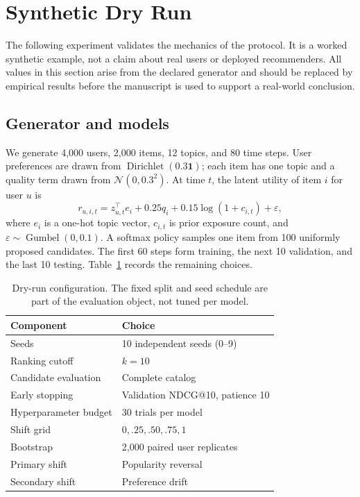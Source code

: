 \section{Synthetic Dry Run}
\label{sec:dryrun}

The following experiment validates the mechanics of the protocol.  It is a
worked synthetic example, not a claim about real users or deployed recommenders.
All values in this section arise from the declared generator and should be
replaced by empirical results before the manuscript is used to support a
real-world conclusion.

\subsection{Generator and models}

We generate 4,000 users, 2,000 items, 12 topics, and 80 time steps.  User
preferences are drawn from $\operatorname{Dirichlet}(0.3\mathbf{1})$; each item
has one topic and a quality term drawn from $\mathcal{N}(0,0.3^2)$.  At time $t$,
the latent utility of item $i$ for user $u$ is
\begin{equation}
  r_{u,i,t}=z_{u,t}^{\top}e_i+0.25q_i+0.15\log(1+c_{i,t})+\varepsilon,
  \label{eq:generator}
\end{equation}
where $e_i$ is a one-hot topic vector, $c_{i,t}$ is prior exposure count, and
$\varepsilon\sim\operatorname{Gumbel}(0,0.1)$.  A softmax policy samples one item
from 100 uniformly proposed candidates.  The first 60 steps form training, the
next 10 validation, and the last 10 testing.  Table~\ref{tab:setup} records the
remaining choices.

\begin{table}[t]
  \caption{Dry-run configuration.  The fixed split and seed schedule are part of
  the evaluation object, not tuned per model.}
  \label{tab:setup}
  \small
  \begin{tabular}{ll}
    \toprule
    Component & Choice \\
    \midrule
    Seeds & 10 independent seeds (0--9) \\
    Ranking cutoff & $k=10$ \\
    Candidate evaluation & Complete catalog \\
    Early stopping & Validation NDCG@10, patience 10 \\
    Hyperparameter budget & 30 trials per model \\
    Shift grid & $0,.25,.50,.75,1$ \\
    Bootstrap & 2,000 paired user replicates \\
    Primary shift & Popularity reversal \\
    Secondary shift & Preference drift \\
    \bottomrule
  \end{tabular}
\end{table}

